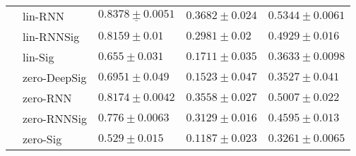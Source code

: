 \begin{tabular}{lllll}
       & lin-RNN &            $  \underline{ 0.8378 \pm 0.0051 } $ &                            $ 0.3682 \pm 0.024 $ &              $  \mathbf{ 0.5344 \pm 0.0061 } $ \\
       & lin-RNNSig &                             $ 0.8159 \pm 0.01 $ &                             $ 0.2981 \pm 0.02 $ &                           $ 0.4929 \pm 0.016 $ \\
       & lin-Sig &                             $ 0.655 \pm 0.031 $ &                            $ 0.1711 \pm 0.035 $ &                          $ 0.3633 \pm 0.0098 $ \\
       & zero-DeepSig &                            $ 0.6951 \pm 0.049 $ &                            $ 0.1523 \pm 0.047 $ &                           $ 0.3527 \pm 0.041 $ \\
       & zero-RNN &                           $ 0.8174 \pm 0.0042 $ &                            $ 0.3558 \pm 0.027 $ &                           $ 0.5007 \pm 0.022 $ \\
       & zero-RNNSig &                            $ 0.776 \pm 0.0063 $ &                            $ 0.3129 \pm 0.016 $ &                           $ 0.4595 \pm 0.013 $ \\
       & zero-Sig &                             $ 0.529 \pm 0.015 $ &                            $ 0.1187 \pm 0.023 $ &                          $ 0.3261 \pm 0.0065 $ \\
\bottomrule
\end{tabular}
